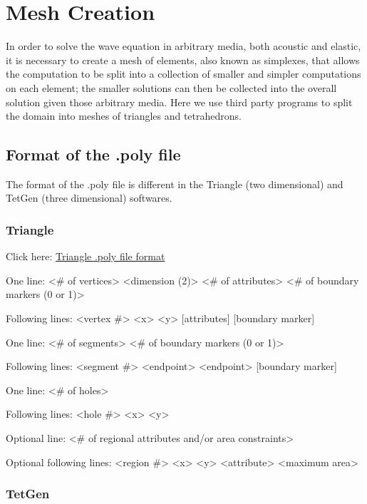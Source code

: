\newpage
\section{Mesh Creation} \label{Mesh-Creation}

In order to solve the wave equation in arbitrary media, both acoustic and elastic, it is necessary to create a mesh of elements, also known as simplexes, that allows the computation to be split into a collection of smaller and simpler computations on each element; the smaller solutions can then be collected into the overall solution given those arbitrary media. Here we use third party programs to split the domain into meshes of triangles and tetrahedrons. 

\subsection{Format of the .poly file}

The format of the .poly file is different in the Triangle (two dimensional) and TetGen (three dimensional) softwares. 

\subsubsection{Triangle \cite{TrianglePoly}}

Click here: \href{https://www.cs.cmu.edu/~quake/triangle.poly.html}{Triangle .poly file format} 


One line: <\# of vertices> <dimension (2)> <\# of attributes> <\# of boundary markers (0 or 1)>

Following lines: <vertex \#> <x> <y> [attributes] [boundary marker]

One line: <\# of segments> <\# of boundary markers (0 or 1)>

Following lines: <segment \#> <endpoint> <endpoint> [boundary marker]

One line: <\# of holes>

Following lines: <hole \#> <x> <y>

Optional line: <\# of regional attributes and/or area constraints>

Optional following lines: <region \#> <x> <y> <attribute> <maximum area>


\subsubsection{TetGen \cite{TetGenPoly}}

